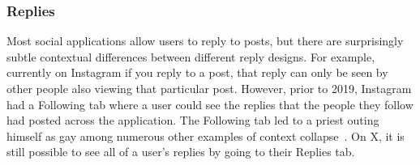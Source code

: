 







\subsubsection{Replies}

Most social applications allow users to reply to posts, but there are surprisingly subtle
contextual differences between different reply designs.
For example, currently on Instagram
if you reply to a post, that reply can only be seen by other
people also viewing that particular post.
However, prior to 2019, Instagram had a Following tab where a user could see
the replies that the people they follow had posted across the application.
The Following tab led to a priest outing himself as gay among numerous other
examples of context collapse~\cite{instagramfollowingtab}.
On X, it is still possible to see all of a user's replies by going
to their Replies tab.

